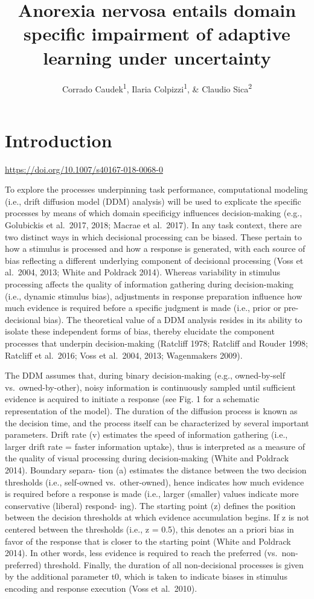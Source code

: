 \documentclass[
  man]{apa6}
\title{Anorexia nervosa entails domain specific impairment of adaptive learning under uncertainty}
\author{Corrado Caudek\textsuperscript{1}, Ilaria Colpizzi\textsuperscript{1}, \& Claudio Sica\textsuperscript{2}}
\date{}
\affiliation{\vspace{0.5cm}\textsuperscript{1} NEUROFARBA Department, Psychology Section, University of Florence, Italy.\\\textsuperscript{2} Health Sciences Department, Psychology Section, University of Florence, Italy.}
\begin{document}
\maketitle

\hypertarget{introduction}{%
\section{Introduction}\label{introduction}}

\url{https://doi.org/10.1007/s40167-018-0068-0}

To explore the processes underpinning task performance, computational modeling (i.e., drift diffusion model (DDM) analysis) will be used to explicate the specific processes by means of which domain specificigy influences decision-making (e.g., Golubickis et al.~2017, 2018; Macrae et al.~2017). In any task context, there are two distinct ways in which decisional processing can be biased. These pertain to how a stimulus is processed and how a response is generated, with each source of bias reflecting a different underlying component of decisional processing (Voss et al.~2004, 2013; White and Poldrack 2014). Whereas variability in stimulus processing affects the quality of information gathering during decision-making (i.e., dynamic stimulus bias), adjustments in response preparation influence how much evidence is required before a specific judgment is made (i.e., prior or pre-decisional bias). The theoretical value of a DDM analysis resides in its ability to isolate these independent forms of bias, thereby elucidate the component processes that underpin decision-making (Ratcliff 1978; Ratcliff and Rouder 1998; Ratcliff et al.~2016; Voss et al.~2004, 2013; Wagenmakers 2009).

The DDM assumes that, during binary decision-making (e.g., owned-by-self vs.~owned-by-other), noisy information is continuously sampled until sufficient evidence is acquired to initiate a response (see Fig. 1 for a schematic representation of the model). The duration of the diffusion process is known as the decision time, and the process itself can be characterized by several important parameters. Drift rate (v) estimates the speed of information gathering (i.e., larger drift rate = faster information uptake), thus is interpreted as a measure of the quality of visual processing during decision-making (White and Poldrack 2014). Boundary separa- tion (a) estimates the distance between the two decision thresholds (i.e., self-owned vs.~other-owned), hence indicates how much evidence is required before a response is made (i.e., larger (smaller) values indicate more conservative (liberal) respond- ing). The starting point (z) defines the position between the decision thresholds at which evidence accumulation begins. If z is not centered between the thresholds (i.e., z = 0.5), this denotes an a priori bias in favor of the response that is closer to the starting point (White and Poldrack 2014). In other words, less evidence is required to reach the preferred (vs.~non-preferred) threshold. Finally, the duration of all non-decisional processes is given by the additional parameter t0, which is taken to indicate biases in stimulus encoding and response execution (Voss et al.~2010).
\end{document}
